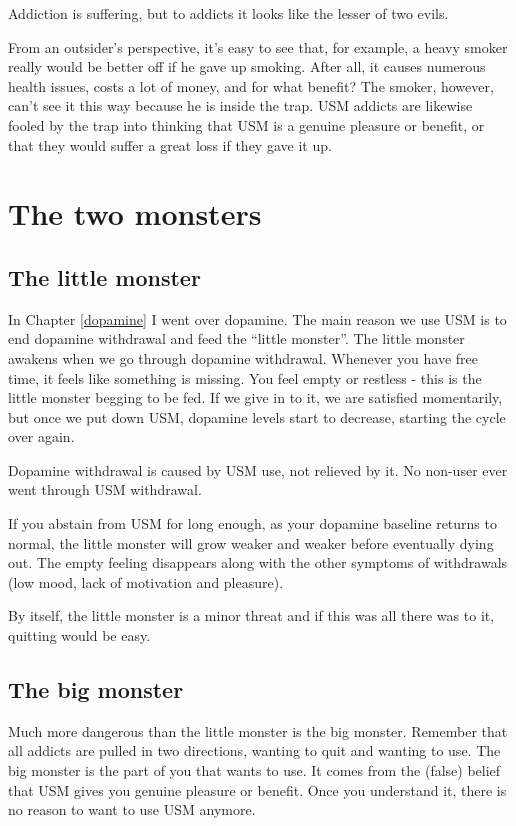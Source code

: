 \documentclass[
  openany]{book}
\begin{document}
Addiction is suffering, but to addicts it looks like the lesser of two evils.

From an outsider's perspective, it's easy to see that, for example, a heavy smoker really would be better off if he gave up smoking. After all, it causes numerous health issues, costs a lot of money, and for what benefit? The smoker, however, can't see it this way because he is inside the trap. USM addicts are likewise fooled by the trap into thinking that USM is a genuine pleasure or benefit, or that they would suffer a great loss if they gave it up.

\chapter{The two monsters}\label{two-monsters}

\section{The little monster}\label{the-little-monster}

In Chapter \ref{dopamine} I went over dopamine. The main reason we use USM is to end dopamine withdrawal and feed the ``little monster''. The little monster awakens when we go through dopamine withdrawal. Whenever you have free time, it feels like something is missing. You feel empty or restless - this is the little monster begging to be fed. If we give in to it, we are satisfied momentarily, but once we put down USM, dopamine levels start to decrease, starting the cycle over again.

Dopamine withdrawal is caused by USM use, not relieved by it. No non-user ever went through USM withdrawal.

If you abstain from USM for long enough, as your dopamine baseline returns to normal, the little monster will grow weaker and weaker before eventually dying out. The empty feeling disappears along with the other symptoms of withdrawals (low mood, lack of motivation and pleasure).

By itself, the little monster is a minor threat and if this was all there was to it, quitting would be easy.

\section{The big monster}\label{the-big-monster}

Much more dangerous than the little monster is the big monster. Remember that all addicts are pulled in two directions, wanting to quit and wanting to use. The big monster is the part of you that wants to use. It comes from the (false) belief that USM gives you genuine pleasure or benefit. Once you understand it, there is no reason to want to use USM anymore.
\end{document}
